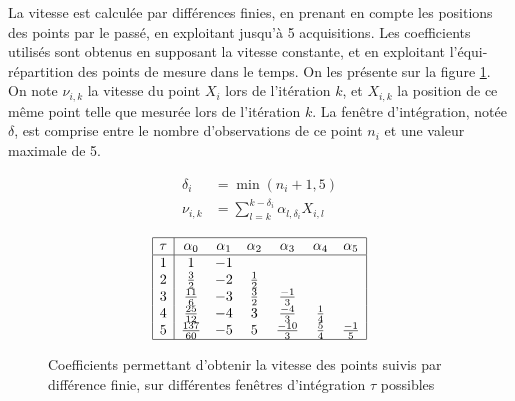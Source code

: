 La vitesse est calculée par différences finies, en prenant en compte les positions des points par le passé, en exploitant jusqu'à 5 acquisitions. Les coefficients utilisés sont obtenus en supposant la vitesse constante, et en exploitant l'équi-répartition des points de mesure dans le temps. On les présente sur la figure \ref{tab:ch5_coefficients_vitesse}. On note $\nu_{i,k}$ la vitesse du point $X_i$ lors de l'itération $k$, et $X_{i,k}$ la position de ce même point telle que mesurée lors de l'itération $k$. La fenêtre d'intégration, notée $\delta$, est comprise entre le nombre d'observations de ce point $n_i$ et une valeur maximale de 5.

\begin{align}
	\delta_i 	&= \min(n_i +1, 5)	\\
	\nu_{i,k} &= \sum\limits_{l=k}^{k-\delta_i} \alpha_{l, \delta_i} X_{i,l}
\end{align}

\begin{figure}
	\renewcommand{\arraystretch}{1.2}
	
	\begin{equation}
		\begin{array} {| c | c  c  c  c  c  c |}
			\hline
			\tau & \alpha_0 & \alpha_1 & \alpha_2 & \alpha_3 & \alpha_4 & \alpha_5 \\
			\hline
			1 	& 1 							& -1 	& 						& 							& 						& \\
			2 	& \frac{3}{2}			& -2	& \frac{1}{2}	& 							& 						& \\
			3 	& \frac{11}{6}		& -3	& \frac{3}{2}	& \frac{-1}{3}	& 						& \\
			4 	& \frac{25}{12}		& -4	& 					3	& \frac{-4}{3} 	& \frac{1}{4} & \\
			5 	& \frac{137}{60}	& -5	& 					5	& \frac{-10}{3}	&	\frac{5}{4} & \frac{-1}{5}\\
			\hline
			\end{array}
	\end{equation}
	\caption{Coefficients permettant d'obtenir la vitesse des points suivis par différence finie, sur différentes fenêtres d'intégration $\tau$ possibles}
	\label{tab:ch5_coefficients_vitesse}
\end{figure}


